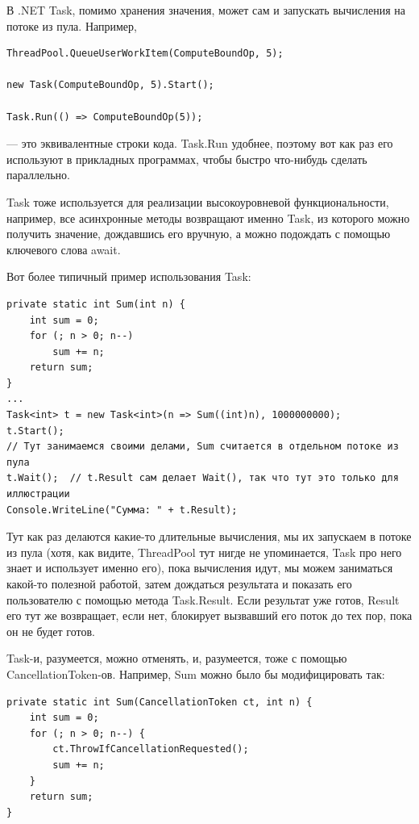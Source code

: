 \documentclass[a5paper]{article}
\begin{document}
В .NET Task, помимо хранения значения, может сам и запускать вычисления на потоке из пула. Например,

\begin{verbatim}
ThreadPool.QueueUserWorkItem(ComputeBoundOp, 5);

new Task(ComputeBoundOp, 5).Start();

Task.Run(() => ComputeBoundOp(5));
\end{verbatim}

--- это эквивалентные строки кода. Task.Run удобнее, поэтому вот как раз его используют в прикладных программах, чтобы быстро что-нибудь сделать параллельно.

Task тоже используется для реализации высокоуровневой функциональности, например, все асинхронные методы возвращают именно Task, из которого можно получить значение, дождавшись его вручную, а можно подождать с помощью ключевого слова await.

Вот более типичный пример использования Task:

\begin{verbatim}
private static int Sum(int n) {
    int sum = 0;
    for (; n > 0; n--)
        sum += n;
    return sum;
}
...
Task<int> t = new Task<int>(n => Sum((int)n), 1000000000);
t.Start();
// Тут занимаемся своими делами, Sum считается в отдельном потоке из пула
t.Wait();  // t.Result сам делает Wait(), так что тут это только для иллюстрации
Console.WriteLine("Сумма: " + t.Result);
\end{verbatim}

Тут как раз делаются какие-то длительные вычисления, мы их запускаем в потоке из пула (хотя, как видите, ThreadPool тут нигде не упоминается, Task про него знает и использует именно его), пока вычисления идут, мы можем заниматься какой-то полезной работой, затем дождаться результата и показать его пользователю с помощью метода Task.Result. Если результат уже готов, Result его тут же возвращает, если нет, блокирует вызвавший его поток до тех пор, пока он не будет готов.

Task-и, разумеется, можно отменять, и, разумеется, тоже с помощью CancellationToken-ов. Например, Sum можно было бы модифицировать так:

\begin{verbatim}
private static int Sum(CancellationToken ct, int n) {
    int sum = 0;
    for (; n > 0; n--) {
        ct.ThrowIfCancellationRequested();
        sum += n;
    }
    return sum;
}
\end{verbatim}
\end{document}
